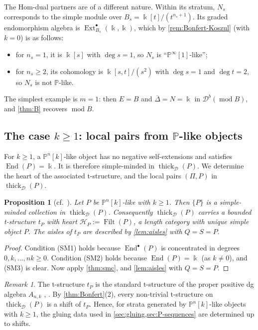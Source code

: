 \documentclass[11pt,reqno]{amsart}
\theoremstyle{plain}
\newtheorem{proposition}[theorem]{Proposition}
\theoremstyle{definition}
\theoremstyle{remark}
\newtheorem{remark}[theorem]{Remark}
\newcommand{\kk}{\Bbbk}
\DeclareMathOperator{\End}{End}
\DeclareMathOperator{\Ext}{Ext}
\DeclareMathOperator{\Filt}{Filt}
\newcommand{\modd}{\operatorname{mod}}
\newcommand{\Db}{\mathcal{D}^b}
\newcommand{\thick}[2][\cD]{\operatorname{thick}_{#1}(#2)}
\newcommand{\Pn}[2]{\mathbb{P}^{#1}[#2]}
\newcommand{\Deltabar}{\overline{\Delta}}
\newcommand{\cD}{\mathcal{D}}
\newcommand{\cH}{\mathcal{H}}
\begin{document}
The Hom-dual partners are of a different nature. Within its stratum, $N_s$ corresponds to the simple module over $B_s=\kk[t]/(t^{n_s+1})$. Its graded endomorphism algebra is $\Ext^\bullet_{B_s}(\kk,\kk)$, which by \cref{rem:Bonfert-Koszul} (with $k=0$) is as follows:
\begin{itemize}
\item for $n_s=1$, it is $\kk[s]$ with $\deg s=1$, so $N_s$ is ``$\Pn\infty1$-like'';
\item for $n_s\ge2$, its cohomology is $\kk[s,t]/(s^2)$ with $\deg s=1$ and $\deg t=2$, so $N_s$ is not $\mathbb{P}$-like.
\end{itemize}
The simplest example is $m=1$: then $E=B$ and $\Deltabar=N=\kk$ in $\Db(\modd B)$, and \cref{thm:B} recovers $\modd B$.


\subsection{The case \texorpdfstring{$k\ge1$}{k>=1}: local pairs from \texorpdfstring{$\mathbb{P}$}{P}-like objects}\label{sec:P-positive}

For $k\ge1$, a $\Pn nk$-like object has no negative self-extensions and satisfies $\End(P)=\kk$. It is therefore simple-minded in $\thick{P}$. We determine the heart of the associated t-structure, and the local pairs $(\Pi,P)$ in $\thick{P}$.


\begin{proposition}[{cf.\ \cite[\S3.2]{Bonf26}}]\label{prop:tP}
Let $P$ be $\Pn nk$-like with $k\ge1$. Then $\{P\}$ is a simple-minded collection in $\thick P$. Consequently $\thick P$ carries a bounded t-structure $t_P$ with heart $\cH_P:=\Filt(P)$, a length category with unique simple object $P$. The aisles of $t_P$ are described by \cref{lem:aisles} with $Q=S=P$.
\end{proposition}

\begin{proof}
Condition (SM1) holds because $\End^\bullet(P)$ is concentrated in degrees $0,k,\dots,nk\ge0$. Condition (SM2) holds because $\End(P)=\kk$ (as $k\ne0$), and (SM3) is clear. Now apply \cref{thm:smc}, and \cref{lem:aisles} with $Q=S=P$.
\end{proof}

\begin{remark}\label{rem:tP-unique}
The t-structure $t_P$ is the standard t-structure of the proper positive dg algebra $A_{n,k}$ \cite[Thm.~7.1]{KN13}, \cite[\S3.2]{Bonf26}. By \cref{thm:Bonfert}(2), every non-trivial t-structure on $\thick P$ is a shift of $t_P$. Hence, for strata generated by $\Pn nk$-like objects with $k\ge1$, the gluing data used in \cref{sec:gluing,sec:P-sequences} are determined up to shifts.
\end{remark}
\end{document}
